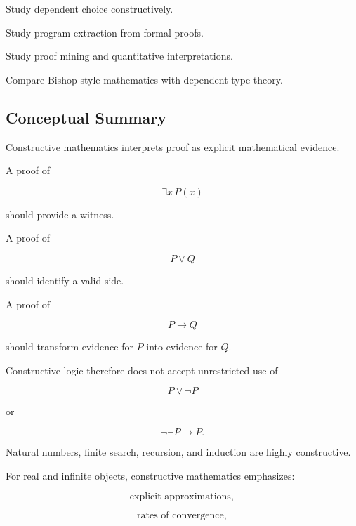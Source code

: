 \begin{exercise}[4]
Study dependent choice constructively.
\end{exercise}

\begin{exercise}[4]
Study program extraction from formal proofs.
\end{exercise}

\begin{exercise}[4]
Study proof mining and quantitative interpretations.
\end{exercise}

\begin{exercise}[4]
Compare Bishop-style mathematics with dependent type theory.
\end{exercise}

\subsection{Conceptual Summary}
\label{subsec:constructive-mathematics-summary}

Constructive mathematics interprets proof as explicit mathematical evidence.

A proof of

\[
\boxed{
\exists x\,P(x)
}
\]

should provide a witness.

A proof of

\[
\boxed{
P\lor Q
}
\]

should identify a valid side.

A proof of

\[
\boxed{
P\rightarrow Q
}
\]

should transform evidence for \(P\) into evidence for \(Q\).

Constructive logic therefore does not accept unrestricted use of

\[
\boxed{
P\lor\neg P
}
\]

or

\[
\boxed{
\neg\neg P\rightarrow P.
}
\]

Natural numbers, finite search, recursion, and induction are highly
constructive.

For real and infinite objects, constructive mathematics emphasizes:

\[
\boxed{
\text{explicit approximations},
}
\]

\[
\boxed{
\text{rates of convergence},
}
\]

